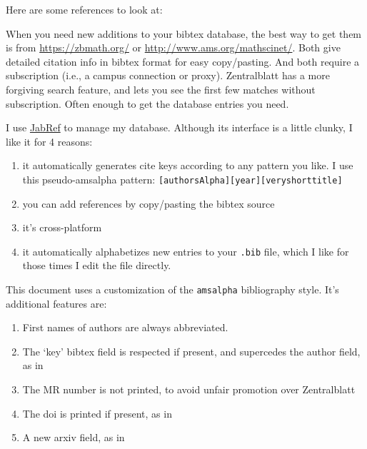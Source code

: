 \documentclass[11pt,oneside,draft]{amsart}
\begin{document}
Here are some references to look at:  \cite{ATC,sage,JN2010Complex,GO2012Infinite,Eve1991Cohomology,Eve1961Cohomology,EKMM1997Rings,Ada1974Stable}

When you need new additions to your bibtex database, the best way to
get them is from \url{https://zbmath.org/} or
\url{http://www.ams.org/mathscinet/}.  Both give detailed citation
info in bibtex format for easy copy/pasting.  And both require a
subscription (i.e., a campus connection or proxy).  Zentralblatt has a
more forgiving search feature, and lets you see the first few matches
without subscription.  Often enough to get the database entries you need.

I use \href{http://jabref.sourceforge.net/}{JabRef} to manage my
database.  Although its interface is a little clunky, I like it for 4 reasons:
\begin{enumerate}
\item it automatically generates cite keys according to any pattern
  you like.  I use this pseudo-amsalpha pattern: \texttt{[authorsAlpha][year][veryshorttitle]}
\item you can add references by copy/pasting the bibtex source
\item it's cross-platform
\item it automatically alphabetizes new entries to your \texttt{.bib} file, which I
  like for those times I edit the file directly.
\end{enumerate}

This document uses a customization of the \texttt{amsalpha}
bibliography style.  It's additional features are:
\begin{enumerate}
\item First names of authors are always abbreviated.
\item The `key' bibtex field is respected if present, and supercedes
  the author field, as in \cite{ATC,sage}
\item The MR number is not printed, to avoid unfair promotion over
  Zentralblatt
\item The doi is printed if present, as in \cite{JN2010Complex}
\item A new arxiv field, as in \cite{GO2012Infinite,JN2010Complex}
\end{enumerate}
 
\end{document}
